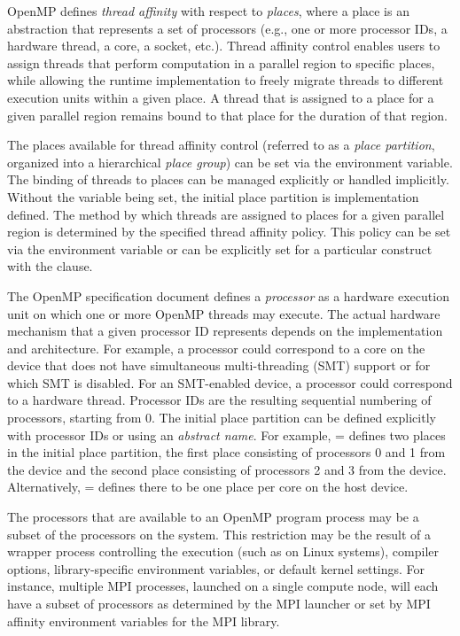 \label{chap:openmp_affinity}

OpenMP defines \emph{thread affinity} with respect to \emph{places}, where a
place is an abstraction that represents a set of processors (e.g., one or more
processor IDs, a hardware thread, a core, a socket, etc.). Thread affinity
control enables users to assign threads that perform computation in a parallel
region to specific places, while allowing the runtime implementation to freely
migrate threads to different execution units within a given place. A thread
that is assigned to a place for a given parallel region remains bound to that
place for the duration of that region.

The places available for thread affinity control (referred to as a \emph{place
partition}, organized into a hierarchical \emph{place group}) can be set via the
 environment variable. The binding of threads to places can
be managed explicitly or handled implicitly.  Without the 
variable being set, the initial place partition is implementation defined.  The
method by which threads are assigned to places for a given parallel region is
determined by the specified thread affinity policy. This policy can be set via
the  environment variable or can be explicitly set for a
particular  construct with the  clause.

The OpenMP specification document defines a \emph{processor} as a hardware
execution unit on which one or more OpenMP threads may execute. The actual
hardware mechanism that a given processor ID represents depends on the
implementation and architecture. For example, a processor could correspond to a
core on the device that does not have simultaneous multi-threading (SMT)
support or for which SMT is disabled. For an SMT-enabled device, a
processor could correspond to a hardware thread. Processor IDs are the
resulting sequential numbering of processors, starting from 0. The initial
place partition can be defined explicitly with processor IDs or using an
\emph{abstract name}. For example, =
defines two places in the initial place partition, the first place consisting
of processors 0 and 1 from the device and the second place consisting of
processors 2 and 3 from the device. Alternatively, 
=
defines there to be one place per core on the host device.

The processors that are available to an OpenMP program process may be a subset
of the processors on the system. This restriction may be the result of a
wrapper process controlling the execution (such as  on Linux
systems), compiler options, library-specific environment variables, or default
kernel settings. For instance, multiple MPI processes, launched
on a single compute node, will each have a subset of processors as determined
by the MPI launcher or set by MPI affinity environment variables for the MPI
library.

